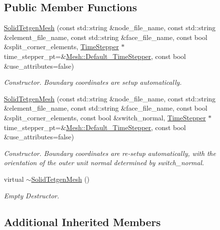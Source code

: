 \subsection*{Public Member Functions}
\begin{DoxyCompactItemize}
\item 
\hyperlink{classoomph_1_1SolidTetgenMesh_a0672182524354abfccbbd85007753bbe}{Solid\+Tetgen\+Mesh} (const std\+::string \&node\+\_\+file\+\_\+name, const std\+::string \&element\+\_\+file\+\_\+name, const std\+::string \&face\+\_\+file\+\_\+name, const bool \&split\+\_\+corner\+\_\+elements, \hyperlink{classoomph_1_1TimeStepper}{Time\+Stepper} $\ast$time\+\_\+stepper\+\_\+pt=\&\hyperlink{classoomph_1_1Mesh_a12243d0fee2b1fcee729ee5a4777ea10}{Mesh\+::\+Default\+\_\+\+Time\+Stepper}, const bool \&use\+\_\+attributes=false)
\begin{DoxyCompactList}\small\item\em Constructor. Boundary coordinates are setup automatically. \end{DoxyCompactList}\item 
\hyperlink{classoomph_1_1SolidTetgenMesh_a465c659e5bac66790a81f013bef23157}{Solid\+Tetgen\+Mesh} (const std\+::string \&node\+\_\+file\+\_\+name, const std\+::string \&element\+\_\+file\+\_\+name, const std\+::string \&face\+\_\+file\+\_\+name, const bool \&split\+\_\+corner\+\_\+elements, const bool \&switch\+\_\+normal, \hyperlink{classoomph_1_1TimeStepper}{Time\+Stepper} $\ast$time\+\_\+stepper\+\_\+pt=\&\hyperlink{classoomph_1_1Mesh_a12243d0fee2b1fcee729ee5a4777ea10}{Mesh\+::\+Default\+\_\+\+Time\+Stepper}, const bool \&use\+\_\+attributes=false)
\begin{DoxyCompactList}\small\item\em Constructor. Boundary coordinates are re-\/setup automatically, with the orientation of the outer unit normal determined by switch\+\_\+normal. \end{DoxyCompactList}\item 
virtual \hyperlink{classoomph_1_1SolidTetgenMesh_afbd361be70e8d0f585a63cc300a26af7}{$\sim$\+Solid\+Tetgen\+Mesh} ()
\begin{DoxyCompactList}\small\item\em Empty Destructor. \end{DoxyCompactList}\end{DoxyCompactItemize}
\subsection*{Additional Inherited Members}


